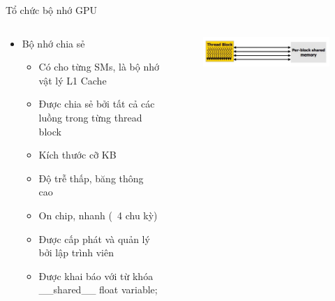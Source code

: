 \documentclass[10pt]{beamer}
\theoremstyle{remark}
\numberwithin{algocf}{section}
\numberwithin{equation}{section}
\numberwithin{dl}{section}
\numberwithin{figure}{section}
\begin{document}
\begin{frame}{Tổ chức bộ nhớ GPU}
    \begin{columns}[onlytextwidth]
        \begin{column}{0.5\linewidth}
            \begin{itemize}
                \item Bộ nhớ chia sẻ
                \begin{itemize}
                    \item Có cho từng SMs, là bộ nhớ vật lý L1 Cache
                    \item Được chia sẻ bởi tất cả các luồng trong từng thread block
                    \item Kích thước cỡ KB
                    \item Độ trễ thấp, băng thông cao
                    \item On chip, nhanh (~4 chu kỳ)
                    \item Được cấp phát và quản lý bởi lập trình viên
                    \item Được khai báo với từ khóa \_\_shared\_\_ float variable;
                \end{itemize}
            \end{itemize}
        \end{column}
        \begin{column}{0.5\linewidth}
            \begin{figure}[H]
                \centering
                \includegraphics[width=\linewidth]{figures/CUDA/GPU_Shared_Memory.png}
            \end{figure}
        \end{column}
    \end{columns}
\end{frame}
\end{document}
